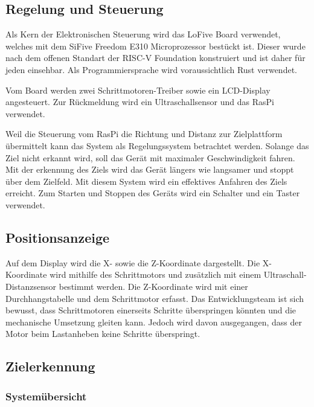 \documentclass[a4paper]{report}
\begin{document}
\subsection{Regelung und Steuerung}

Als Kern der Elektronischen Steuerung wird das LoFive Board verwendet, welches mit dem SiFive Freedom E310 Microprozessor bestückt ist. Dieser wurde nach dem offenen Standart der RISC-V Foundation konstruiert und ist daher für jeden einsehbar. Als Programmiersprache wird voraussichtlich Rust verwendet.

Vom Board werden zwei Schrittmotoren-Treiber sowie ein LCD-Display angesteuert. Zur Rückmeldung wird ein Ultraschallsensor und das RasPi verwendet.

Weil die Steuerung vom RasPi die Richtung und Distanz zur Zielplattform übermittelt kann das System als Regelungssystem betrachtet werden. Solange das Ziel nicht erkannt wird, soll das Gerät mit maximaler Geschwindigkeit fahren. Mit der erkennung des Ziels wird das Gerät längers wie langsamer und stoppt über dem Zielfeld. Mit diesem System wird ein effektives Anfahren des Ziels erreicht. Zum Starten und Stoppen des Geräts wird ein Schalter und ein Taster verwendet.

\subsection{Positionsanzeige}

Auf dem Display wird die X- sowie die Z-Koordinate dargestellt. Die X-Koordinate wird mithilfe des Schrittmotors und zusätzlich mit einem Ultraschall-Distanzsensor bestimmt werden. Die Z-Koordinate wird mit einer Durchhangstabelle und dem Schrittmotor erfasst. Das Entwicklungsteam ist sich bewusst, dass Schrittmotoren einerseits Schritte überspringen könnten und die mechanische Umsetzung gleiten kann. Jedoch wird davon ausgegangen, dass der Motor beim Lastanheben keine Schritte überspringt.

\newpage
\subsection{Zielerkennung}
\subsubsection{Systemübersicht}
\end{document}
